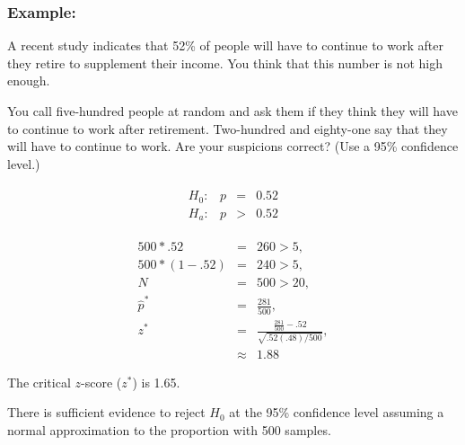 \begin{frame}
  \frametitle{Example: }

  \vspace*{-2em}
  A recent study indicates that 52\% of people will have to continue
  to work after they retire to supplement their income. You think that
  this number is not high enough. 

  You call five-hundred people at random and ask them if they think
  they will have to continue to work after retirement. Two-hundred and
  eighty-one say that they will have to continue to work. Are your
  suspicions correct?  (Use a 95\% confidence level.)

  \vfill

  {
    \begin{eqnarray*}
      \begin{array}{lrcl}
        H_0: & p & = & 0.52 \\
        H_a: & p & > & 0.52
      \end{array}
    \end{eqnarray*}
  }

  {
    \begin{eqnarray*}
      500*.52     & = & 260>5, \\
      500*(1-.52) & = & 240>5, \\
      N & = & 500>20, \\
      \hat{p}^* & = & \frac{281}{500}, \\
      z^* & = & \frac{\frac{281}{500}-.52}{\sqrt{.52(.48)/500}}, \\
      & \approx & 1.88
    \end{eqnarray*}
  }
  

  {
    The critical $z$-score ($z^*$) is 1.65.
  }

  {

    {\color{red}
      There is sufficient evidence to reject $H_0$ at the 95\%
      confidence level assuming a normal approximation to the
      proportion with 500 samples.
    }

  }

  \vfill
  
\end{frame}


